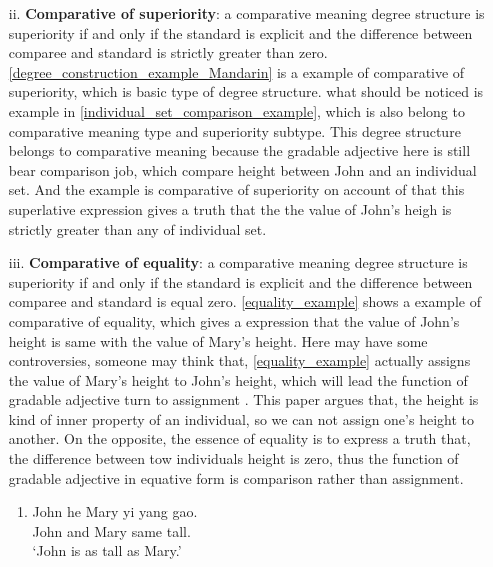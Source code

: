 \documentclass{ctexart}
\let \cite \parencite
\begin{document}
\begin{itemize}
\begin{itemize}
        \item[ii.] \textbf{Comparative of superiority}: a comparative meaning degree structure is superiority if and only if the standard is explicit and the difference between comparee and standard is strictly greater than zero. \ref{degree_construction_example_Mandarin} is a example of comparative of superiority, which is basic type of degree structure. what should be noticed is example in \ref{individual_set_comparison_example}, which is also belong to comparative meaning type and superiority subtype. This degree structure belongs to comparative meaning because the gradable adjective here is still bear comparison job, which compare height between John and an individual set. And the example is comparative of superiority on account of that this superlative expression gives a truth that the the value of John's heigh is strictly greater than any of individual set.
        
        \item[iii.] \textbf{Comparative of equality}: a comparative meaning degree structure is superiority if and only if the standard is explicit and the difference between comparee and standard is equal zero. \ref{equality_example} shows a example of comparative of equality, which gives a expression that the value of John's height is same with the value of Mary's height. Here may have some controversies, someone may think that, \ref{equality_example} actually assigns the value of Mary's height to John's height, which will lead the function of gradable adjective turn to assignment \cite{guo2012}. This paper argues that, the height is kind of inner property of an individual, so we can not assign one's height to another. On the opposite, the essence of equality is to express a truth that, the difference between tow individuals height is zero, thus the function of gradable adjective in equative form is comparison rather than assignment.
        
        \begin{enumerate}
            \item \label{equality_example}
            John he Mary yi yang gao.\\
            John and Mary same tall.\\
            `John is as tall as Mary.'
        \end{enumerate}

    \end{itemize}   

\end{itemize}
\end{document}
